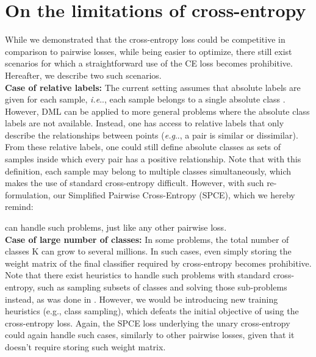 \documentclass[runningheads]{llncs}
\makeatletter
\DeclareRobustCommand\onedot{\futurelet\@let@token\@onedot}
\def\@onedot{\ifx\@let@token.\else.\null\fi\xspace}
\def\eg{\emph{e.g}\onedot} \def\Eg{\emph{E.g}\onedot}
\def\ie{\emph{i.e}\onedot} \def\Ie{\emph{I.e}\onedot}
\makeatother
\begin{document}
\section{On the limitations of cross-entropy}

While we demonstrated that the cross-entropy loss could be competitive in comparison to pairwise losses, while being easier to optimize, there still exist scenarios for which a straightforward use of the CE loss becomes prohibitive. Hereafter, we describe two such scenarios. \\

\textbf{Case of relative labels: } The current setting assumes that absolute labels are given for each sample, \ie, each sample  belongs to a single absolute class . However, DML can be applied to more general problems where the absolute class labels are not available. Instead, one has access to relative labels that only describe the relationships between points (\eg, a pair is similar or dissimilar). From these relative labels, one could still define absolute classes as sets of samples inside which every pair has a positive relationship. Note that with this definition, each sample may belong to multiple classes simultaneously, which makes the use of standard cross-entropy difficult.
However, with such re-formulation, our Simplified Pairwise Cross-Entropy (SPCE), which we hereby remind:

can handle such problems, just like any other pairwise loss. \\

\textbf{Case of large number of classes: } In some problems, the total number of classes K can grow to several millions. In such cases, even simply storing the weight matrix  of the final classifier required by cross-entropy becomes prohibitive. Note that there exist heuristics to handle such problems with standard cross-entropy, such as sampling subsets of classes and solving those sub-problems instead, as was done in \cite{zhai2018classification}. However, we would be introducing new training heuristics (e.g., class sampling), which defeats the initial objective of using the cross-entropy loss. Again, the SPCE loss underlying the unary cross-entropy could again handle such cases, similarly to other pairwise losses, given that it doesn't require storing such weight matrix. 
\end{document}
